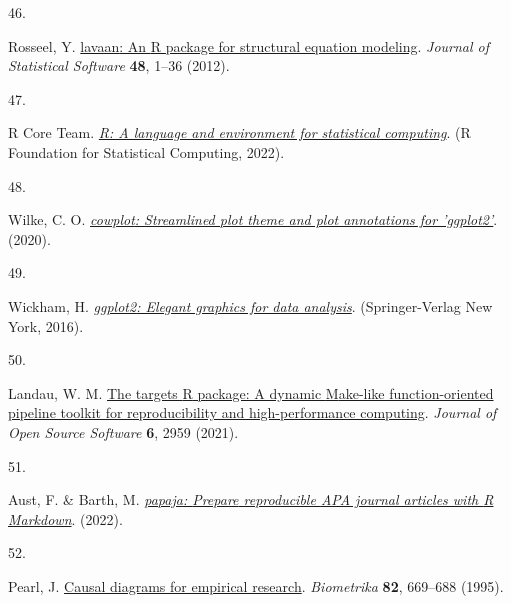 \documentclass[
  man, donotrepeattitle,floatsintext]{apa6}
\newlength{\cslhangindent}
\newlength{\csllabelwidth}
\newlength{\cslentryspacingunit} %
\newenvironment{CSLReferences}[2] %
 {%
  \setlength{\parindent}{0pt}
  \ifodd #1
  \let\oldpar\par
  \def\par{\hangindent=\cslhangindent\oldpar}
  \fi
  \setlength{\parskip}{#2\cslentryspacingunit}
 }%
 {}
\newcommand{\CSLLeftMargin}[1]{\parbox[t]{\csllabelwidth}{#1}}
\newcommand{\CSLRightInline}[1]{\parbox[t]{\linewidth - \csllabelwidth}{#1}\break}
\begin{document}
\begin{CSLReferences}{0}{0}
\leavevmode{}%
\CSLLeftMargin{46. }%
\CSLRightInline{Rosseel, Y. \href{https://doi.org/10.18637/jss.v048.i02}{{lavaan}: An {R} package for structural equation modeling}. \emph{Journal of Statistical Software} \textbf{48}, 1--36 (2012).}

\leavevmode{}%
\CSLLeftMargin{47. }%
\CSLRightInline{R Core Team. \emph{\href{https://www.R-project.org/}{R: A language and environment for statistical computing}}. (R Foundation for Statistical Computing, 2022).}

\leavevmode{}%
\CSLLeftMargin{48. }%
\CSLRightInline{Wilke, C. O. \emph{\href{https://CRAN.R-project.org/package=cowplot}{{cowplot}: Streamlined plot theme and plot annotations for 'ggplot2'}}. (2020).}

\leavevmode{}%
\CSLLeftMargin{49. }%
\CSLRightInline{Wickham, H. \emph{\href{https://ggplot2.tidyverse.org}{{ggplot2}: Elegant graphics for data analysis}}. (Springer-Verlag New York, 2016).}

\leavevmode{}%
\CSLLeftMargin{50. }%
\CSLRightInline{Landau, W. M. \href{https://doi.org/10.21105/joss.02959}{The targets {R} package: A dynamic {M}ake-like function-oriented pipeline toolkit for reproducibility and high-performance computing}. \emph{Journal of Open Source Software} \textbf{6}, 2959 (2021).}

\leavevmode{}%
\CSLLeftMargin{51. }%
\CSLRightInline{Aust, F. \& Barth, M. \emph{\href{https://github.com/crsh/papaja}{{papaja}: {Prepare} reproducible {APA} journal articles with {R Markdown}}}. (2022).}

\leavevmode{}%
\CSLLeftMargin{52. }%
\CSLRightInline{Pearl, J. \href{https://doi.org/10.2307/2337329}{Causal diagrams for empirical research}. \emph{Biometrika} \textbf{82}, 669--688 (1995).}

\end{CSLReferences}

\endgroup

\newpage

\hypertarget{appendix-appendix}{%
\appendix}


\renewcommand{\appendixname}{\textbf{Supplementary Material}}
\renewcommand{\thefigure}{S\arabic{figure}} \setcounter{figure}{0}
\renewcommand{\thetable}{S\arabic{table}} \setcounter{table}{0}
\renewcommand{\theequation}{S\arabic{equation}} \setcounter{equation}{0}
\end{document}
